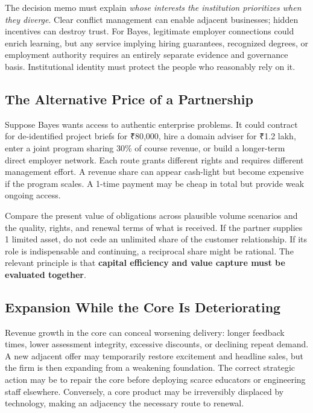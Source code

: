 The decision memo must explain \textit{whose interests the institution prioritizes when they diverge}. Clear conflict management can enable adjacent businesses; hidden incentives can destroy trust. For Bayes, legitimate employer connections could enrich learning, but any service implying hiring guarantees, recognized degrees, or employment authority requires an entirely separate evidence and governance basis. Institutional identity must protect the people who reasonably rely on it.

\subsection{The Alternative Price of a Partnership}
\label{sec:alternative_price_of_partnership}

Suppose Bayes wants access to authentic enterprise problems. It could contract for de-identified project briefs for ₹80,000, hire a domain adviser for ₹1.2 lakh, enter a joint program sharing 30\% of course revenue, or build a longer-term direct employer network. Each route grants different rights and requires different management effort. A revenue share can appear cash-light but become expensive if the program scales. A 1-time payment may be cheap in total but provide weak ongoing access.

Compare the present value of obligations across plausible volume scenarios and the quality, rights, and renewal terms of what is received. If the partner supplies 1 limited asset, do not cede an unlimited share of the customer relationship. If its role is indispensable and continuing, a reciprocal share might be rational. The relevant principle is that \textbf{capital efficiency and value capture must be evaluated together}.

\subsection{Expansion While the Core Is Deteriorating}
\label{sec:expansion_while_core_deteriorating}

Revenue growth in the core can conceal worsening delivery: longer feedback times, lower assessment integrity, excessive discounts, or declining repeat demand. A new adjacent offer may temporarily restore excitement and headline sales, but the firm is then expanding from a weakening foundation. The correct strategic action may be to repair the core before deploying scarce educators or engineering staff elsewhere. Conversely, a core product may be irreversibly displaced by technology, making an adjacency the necessary route to renewal.

